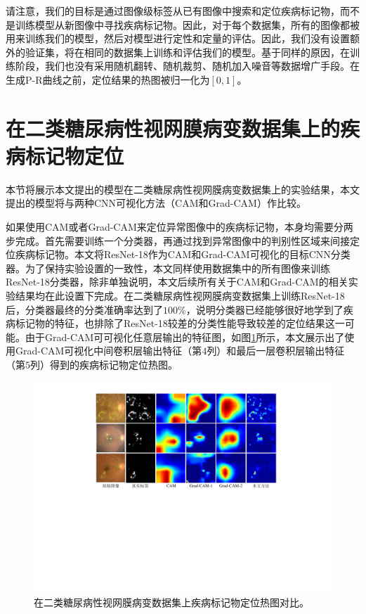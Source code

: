 请注意，我们的目标是通过图像级标签从已有图像中搜索和定位疾病标记物，而不是训练模型从新图像中寻找疾病标记物。因此，对于每个数据集，所有的图像都被用来训练我们的模型，然后对模型进行定性和定量的评估。因此，我们没有设置额外的验证集，将在相同的数据集上训练和评估我们的模型。基于同样的原因，在训练阶段，我们也没有采用随机翻转、随机裁剪、随机加入噪音等数据增广手段。在生成P-R曲线之前，定位结果的热图被归一化为$[0,1]$。

\section{在二类糖尿病性视网膜病变数据集上的疾病标记物定位}\label{sec:bin_dr_ds_experiment}
本节将展示本文提出的模型在二类糖尿病性视网膜病变数据集上的实验结果，本文提出的模型将与两种CNN可视化方法（CAM和Grad-CAM）作比较。

如果使用CAM或者Grad-CAM来定位异常图像中的疾病标记物，本身均需要分两步完成。首先需要训练一个分类器，再通过找到异常图像中的判别性区域来间接定位疾病标记物。本文将ResNet-18作为CAM和Grad-CAM可视化的目标CNN分类器。为了保持实验设置的一致性，本文同样使用数据集中的所有图像来训练ResNet-18分类器，除非单独说明，本文后续所有关于CAM和Grad-CAM的相关实验结果均在此设置下完成。在二类糖尿病性视网膜病变数据集上训练ResNet-18后，分类器最终的分类准确率达到了$100\%$，说明分类器已经能够很好地学到了疾病标记物的特征，也排除了ResNet-18较差的分类性能导致较差的定位结果这一可能。由于Grad-CAM可可视化任意层输出的特征图，如图\ref{fig:retinal_image_res}所示，本文展示出了使用Grad-CAM可视化中间卷积层输出特征（第$4$列）和最后一层卷积层输出特征（第$5$列）得到的疾病标记物定位热图。
\begin{figure}[h]
	\centering
	\includegraphics[width=1.0\textwidth]{figure/retinal_image_res.pdf}
	\caption[在二类糖尿病性视网膜病变数据集上疾病标记物定位热图对比]{在二类糖尿病性视网膜病变数据集上疾病标记物定位热图对比。}
	\label{fig:retinal_image_res}
\end{figure}


